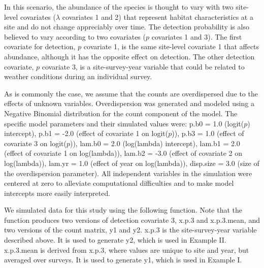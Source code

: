 \documentclass{article}
\begin{document}
In this scenario, the abundance of the species is thought to vary with two site-level covariates ($\lambda$ covariates 1 and 2) that represent habitat characteristics at a site and do not change appreciably over time. The detection probability is also believed to vary according to two covariates ($p$ covariates 1 and 3). The first covariate for detection, $p$ covariate 1, is the same site-level covariate 1 that affects abundance, although it has the opposite effect on detection. The other detection covariate, $p$ covariate 3, is a site-survey-year variable that could be related to weather conditions during an individual survey.

As is commonly the case, we assume that the counts are overdispersed due to the effects of unknown variables. Overdispersion was generated and modeled using a Negative Binomial distribution for the count component of the model. The specific model parameters and their simulated values were: p.b0 = 1.0 (logit($p$) intercept), p.b1 = -2.0 (effect of covariate 1 on logit($p$)), p.b3 = 1.0 (effect of covariate 3 on logit($p$)), lam.b0 = 2.0 (log(lambda) intercept), lam.b1 = 2.0 (effect of covariate 1 on log(lambda)), lam.b2 = -3.0 (effect of covariate 2 on log(lambda)), lam.yr = 1.0 (effect of year on log(lambda)), disp.size = 3.0 (size of the overdispersion parameter). All independent variables in the simulation were centered at zero to alleviate computational difficulties and to make model intercepts more easily interpreted.

We simulated data for this study using the following function. Note that the function produces two versions of detection covariate 3, x.p.3 and x.p.3.mean, and two versions of the count matrix, y1 and y2. x.p.3 is the site-survey-year variable described above. It is used to generate y2, which is used in Example II. x.p.3.mean is derived from x.p.3, where values are unique to site and year, but averaged over surveys. It is used to generate y1, which is used in Example I.
\end{document}

